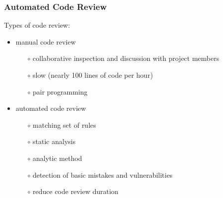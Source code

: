 \documentclass[10pt,xcolor=pdflatex]{beamer}
\begin{document}
\begin{frame}\frametitle{Automated Code Review}
	Types of code review:
	\begin{itemize}
		\item manual code review
			\begin{itemize}
				\item[$\circ$] collaborative inspection and discussion with project members\\[0.25em]
				\item[$\circ$] slow (nearly 100 lines of code per hour)\\[0.25em]
				\item[$\circ$] pair programming\\[0.5em]
			\end{itemize}
		\item automated code review
			\begin{itemize}
				\item[$\circ$] matching set of rules\\[0.25em]
				\item[$\circ$] static analysis\\[0.25em]
				\item[$\circ$] analytic method\\[0.25em]
				\item[$\circ$] detection of basic mistakes and vulnerabilities\\[0.25em]
				\item[$\circ$] reduce code review duration
			\end{itemize}
	\end{itemize}
\end{frame}

\end{document}
